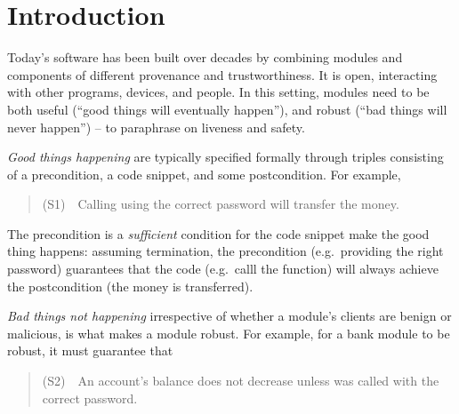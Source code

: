 \section{Introduction}
\label{s:intro}

Today's   software has been built 
over decades by combining modules and components of
different provenance and 
trustworthiness. It 
is open, interacting with other programs, devices, and people.
In this 
setting, modules need to be both useful (``good things
will eventually happen''), and  %
robust (``bad things will never happen'') %
-- to paraphrase   
 on liveness and safety.

\emph{Good things happening} are typically specified formally 
 through  triples consisting of a  precondition, a code snippet, and some
 postcondition.
 For example,
 \begin{quote}
(S1)\ \ Calling  using the correct password will transfer the money.
\end{quote}
The precondition is a \emph{sufficient} condition for the code snippet make
the good thing happens: 
assuming termination, the precondition (e.g.\ providing the right 
password) guarantees that
the code (e.g.\ calll the  function)
will always achieve the postcondition (the money is transferred).

\emph{Bad things not happening}
   irrespective of whether a module's clients are benign or malicious, is what makes a module  robust. 
{For example}, for a bank module to 
be robust, it must 
guarantee  that

\begin{quote}
(S2)\ \ An account's balance does not decrease unless  was called 
with the correct password.
\end{quote}


